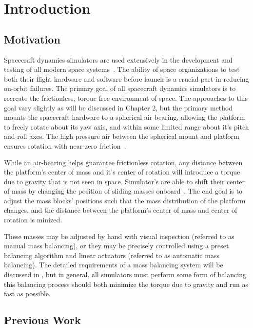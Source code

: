 \chapter{Introduction}

\section{Motivation}
Spacecraft dynamics simulators are used extensively in the development and testing of all modern space systems~\cite{schwartz_historical_2003}. The ability of space organizations to test both their flight hardware and software before launch is a crucial part in reducing on-orbit
failures. The primary goal of all spacecraft dynamics simulators is to recreate the frictionless, torque-free environment of space. The approaches to this goal vary slightly as will be discussed in Chapter 2, but the primary method mounts the spacecraft hardware to a spherical air-bearing, allowing the platform to freely rotate about its yaw axis, and within some limited range about it's pitch and roll axes. The high pressure air between the spherical mount and platform ensures rotation with near-zero friction~\cite{huang_characterizing_2022}.

While an air-bearing helps guarantee frictionless rotation, any distance between the platform's center of mass and it's center of rotation will introduce a torque due to gravity that is not seen in space. Simulator's are able to shift their center of mass by changing the position of sliding masses onboard~\cite{kim_automatic_2009}. The end goal is to adjust the mass blocks' positions such that the mass distribution of the platform changes, and the distance between the platform's center of mass and center of rotation is minized. 


These masses may be adjusted by hand with visual inspection (referred to as manual mass balancing), or they may be precisely controlled using a preset balancing algorithm and linear actuators (referred to as automatic mass balancing). The detailed requirements of a mass balancing system will be discussed in , but in general, all simulators must perform some form of balancing this balancing process should both minimize the torque due to gravity and run as fast as possible.



\section{Previous Work}\label{sec:previous_work}

